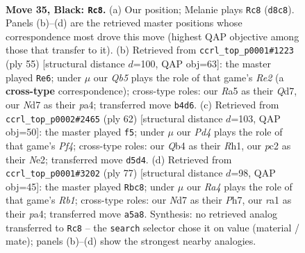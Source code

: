 \documentclass[11pt]{article}
\begin{document}
\clearpage

\begin{figure}[p]\centering
\begin{subfigure}{0.46\textwidth}\centering
\resizebox{\linewidth}{!}{%
\newchessgame
\chessboard[
  setfen={3r2k1/3n2p1/1p3n2/r2p3p/Pq2p2N/2N3P1/2PQ1P1P/R2R1K2 b - - 5 35},
  showmover=false,
  pgfstyle=straightmove, color=movearrow, markmove={d8-c8}
]}
\caption{}
\end{subfigure}\hfill
\begin{subfigure}{0.46\textwidth}\centering
\resizebox{\linewidth}{!}{%
\newchessgame
\chessboard[
  setfen={5rk1/3qr1pp/1pp2p2/p2n4/PnNPN2P/5QP1/1P3PK1/3RR3 b - - 4 28},
  showmover=false,
  pgfstyle=straightmove, color=movearrow, markmove={e7-e6}
]}
\caption{}
\end{subfigure}
\\[4pt]
\begin{subfigure}{0.46\textwidth}\centering
\resizebox{\linewidth}{!}{%
\newchessgame
\chessboard[
  setfen={6k1/ppr1rpn1/6p1/3pP1Rn/q2P1P2/3Q1N2/1P2NK2/7R w - - 0 32},
  showmover=false,
  pgfstyle=straightmove, color=movearrow, markmove={f4-f5}
]}
\caption{}
\end{subfigure}\hfill
\begin{subfigure}{0.46\textwidth}\centering
\resizebox{\linewidth}{!}{%
\newchessgame
\chessboard[
  setfen={1r2n2k/5qpp/p1rp1p2/3Nn3/PBP1R3/7P/2P3P1/3R1Q1K b - - 0 39},
  showmover=false,
  pgfstyle=straightmove, color=movearrow, markmove={b8-c8}
]}
\caption{}
\end{subfigure}
\caption{\textbf{Move 35, Black: \texttt{Rc8}.} (a) Our position; Melanie plays \texttt{Rc8} (\texttt{d8c8}). Panels (b)--(d) are the retrieved master positions whose correspondence most drove this move (highest QAP objective among those that transfer to it). (b) Retrieved from \texttt{ccrl\_top\_p0001\#1223} (ply 55) [structural distance $d$=100, QAP obj=63]: the master played \texttt{Re6}; under $\mu$ our \emph{Qb5} plays the role of that game's \emph{Re2} (a \textbf{cross-type} correspondence); cross-type roles: our \emph{R}a5 as their \emph{Q}d7, our \emph{N}d7 as their \emph{p}a4; transferred move \texttt{b4d6}. (c) Retrieved from \texttt{ccrl\_top\_p0002\#2465} (ply 62) [structural distance $d$=103, QAP obj=50]: the master played \texttt{f5}; under $\mu$ our \emph{Pd4} plays the role of that game's \emph{Pf4}; cross-type roles: our \emph{Q}b4 as their \emph{R}h1, our \emph{p}c2 as their \emph{N}e2; transferred move \texttt{d5d4}. (d) Retrieved from \texttt{ccrl\_top\_p0001\#3202} (ply 77) [structural distance $d$=98, QAP obj=45]: the master played \texttt{Rbc8}; under $\mu$ our \emph{Ra4} plays the role of that game's \emph{Rb1}; cross-type roles: our \emph{N}d7 as their \emph{P}h7, our \emph{r}a1 as their \emph{p}a4; transferred move \texttt{a5a8}. Synthesis: no retrieved analog transferred to \texttt{Rc8} -- the \texttt{search} selector chose it on value (material / mate); panels (b)--(d) show the strongest nearby analogies.}
\label{fig:thought-m69}
\end{figure}
\end{document}
